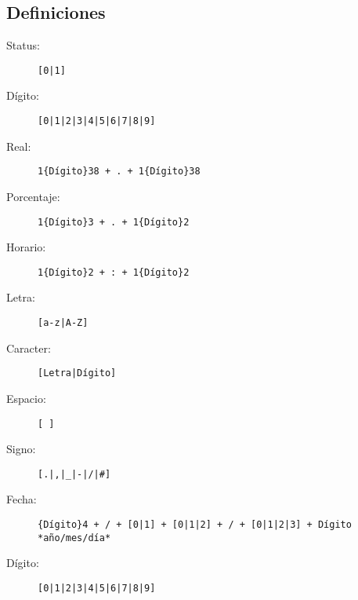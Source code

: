 \subsection{Definiciones}
\begin{description}
\item [Status:]{
\begin{lstlisting}
[0|1]\end{lstlisting}
}
\item [Dígito:]{
\begin{lstlisting}
[0|1|2|3|4|5|6|7|8|9]\end{lstlisting}
}
\item [Real:]{
\begin{lstlisting}
1{Dígito}38 + . + 1{Dígito}38\end{lstlisting}
}
\item [Porcentaje:]{
\begin{lstlisting}
1{Dígito}3 + . + 1{Dígito}2\end{lstlisting}
}
\item [Horario:]{
\begin{lstlisting}
1{Dígito}2 + : + 1{Dígito}2\end{lstlisting}
}
\item [Letra:]{
\begin{lstlisting}
[a-z|A-Z]\end{lstlisting}
}
\item [Caracter:]{
\begin{lstlisting}
[Letra|Dígito]\end{lstlisting}
}
\item [Espacio:]{
\begin{lstlisting}
[ ]
\end{lstlisting}
}
\item [Signo:]{
\begin{lstlisting}
[.|,|_|-|/|#]
\end{lstlisting}
}
\item [Fecha:]{
\begin{lstlisting}
{Dígito}4 + / + [0|1] + [0|1|2] + / + [0|1|2|3] + Dígito *año/mes/día*\end{lstlisting}
}
\item [Dígito:]{
\begin{lstlisting}
[0|1|2|3|4|5|6|7|8|9]\end{lstlisting}
}
\end{description}




